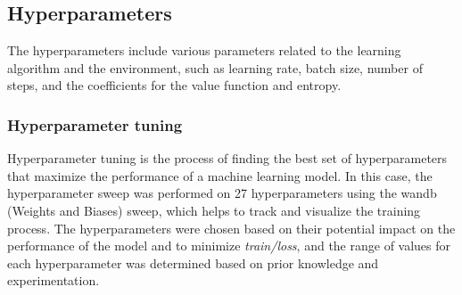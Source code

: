 \documentclass[../xlapes02]{subfiles}
\begin{document}
    \subsection{Hyperparameters}\label{subsec:hyperparameters}
    The hyperparameters include various parameters related to the learning algorithm and the environment, such as learning rate, batch size, number of steps, and the coefficients for the value function and entropy.

    \subsubsection{Hyperparameter tuning}
    Hyperparameter tuning is the process of finding the best set of hyperparameters that maximize the performance of a machine learning model. In this case, the hyperparameter sweep was performed on 27 hyperparameters using the wandb (Weights and Biases) sweep, which helps to track and visualize the training process. The hyperparameters were chosen based on their potential impact on the performance of the model and to minimize \emph{train/loss}, and the range of values for each hyperparameter was determined based on prior knowledge and experimentation.
\end{document}
